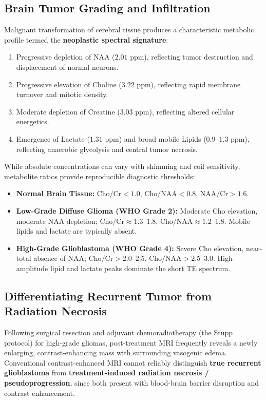 \documentclass[11pt,a4paper]{article}
\begin{document}
\subsection{Brain Tumor Grading and Infiltration}
Malignant transformation of cerebral tissue produces a characteristic metabolic profile termed the \textbf{neoplastic spectral signature}:
\begin{enumerate}
    \item Progressive depletion of NAA ($2.01\text{ ppm}$), reflecting tumor destruction and displacement of normal neurons.
    \item Progressive elevation of Choline ($3.22\text{ ppm}$), reflecting rapid membrane turnover and mitotic density.
    \item Moderate depletion of Creatine ($3.03\text{ ppm}$), reflecting altered cellular energetics.
    \item Emergence of Lactate ($1.31\text{ ppm}$) and broad mobile Lipids ($0.9\text{--}1.3\text{ ppm}$), reflecting anaerobic glycolysis and central tumor necrosis.
\end{enumerate}

\begin{clinicalpearl}
While absolute concentrations can vary with shimming and coil sensitivity, metabolite ratios provide reproducible diagnostic thresholds:
\begin{itemize}
    \item \textbf{Normal Brain Tissue:} $\text{Cho}/\text{Cr} < 1.0$, $\text{Cho}/\text{NAA} < 0.8$, $\text{NAA}/\text{Cr} > 1.6$.
    \item \textbf{Low-Grade Diffuse Glioma (WHO Grade 2):} Moderate Cho elevation, moderate NAA depletion; $\text{Cho}/\text{Cr} \approx 1.3\text{--}1.8$, $\text{Cho}/\text{NAA} \approx 1.2\text{--}1.8$. Mobile lipids and lactate are typically absent.
    \item \textbf{High-Grade Glioblastoma (WHO Grade 4):} Severe Cho elevation, near-total absence of NAA; $\text{Cho}/\text{Cr} > 2.0\text{--}2.5$, $\text{Cho}/\text{NAA} > 2.5\text{--}3.0$. High-amplitude lipid and lactate peaks dominate the short TE spectrum.
\end{itemize}
\end{clinicalpearl}

\subsection{Differentiating Recurrent Tumor from Radiation Necrosis}
Following surgical resection and adjuvant chemoradiotherapy (the Stupp protocol) for high-grade gliomas, post-treatment MRI frequently reveals a newly enlarging, contrast-enhancing mass with surrounding vasogenic edema. Conventional contrast-enhanced MRI cannot reliably distinguish \textbf{true recurrent glioblastoma} from \textbf{treatment-induced radiation necrosis / pseudoprogression}, since both present with blood-brain barrier disruption and contrast enhancement.
\end{document}
